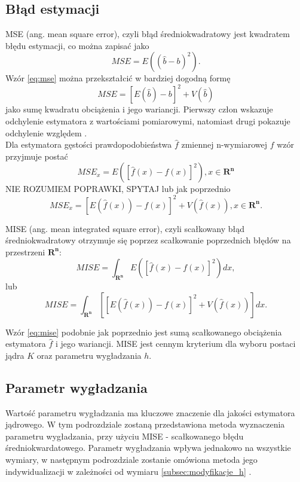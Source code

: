 \subsection{Błąd estymacji}
MSE (ang. mean square error), czyli błąd średniokwadratowy jest kwadratem błędu estymacji, co można zapisać jako \cite{Kul05}
\begin{equation}
\label{eq:mse}
MSE = E({(\hat{b}-b)}^2 ).
\end{equation}
Wzór \eqref{eq:mse} można przekształcić w bardziej dogodną formę
\begin{equation}
MSE = {[E(\hat{b})-b]}^2 +V(\hat{b})
\end{equation}
jako sumę kwadratu obciążenia i jego wariancji. Pierwszy człon wskazuje odchylenie  estymatora z wartościami pomiarowymi, natomiast drugi pokazuje odchylenie względem . \\
Dla estymatora gęstości prawdopodobieństwa $\hat{f}$ zmiennej n-wymiarowej $f$ wzór przyjmuje postać
\begin{equation}
MSE_x = E({[\hat{f}(x)-f(x)]}^2), x \in \mathbf{R^n}
\end{equation} NIE ROZUMIEM POPRAWKI, SPYTAJ
lub jak poprzednio
\begin{equation}
MSE_x = {[E(\hat{f}(x))-f(x)]}^2 + V(\hat{f}(x)), x \in \mathbf{R^n}.
\end{equation}

MISE (ang. mean integrated square error), czyli scałkowany błąd średniokwadratowy otrzymuje się poprzez scałkowanie poprzednich błędów na przestrzeni $\mathbf{R^n}$:
\begin{equation}
MISE = \int_{\mathbf{R^n}} E({[\hat{f}(x)-f(x)]}^2) dx,
\end{equation}
lub
\begin{equation}
\label{eq:mise}
MISE = \int_{\mathbf{R^n}} [{[E(\hat{f}(x))-f(x)]}^2 + V(\hat{f}(x))]dx.
\end{equation}

Wzór \eqref{eq:mise} podobnie jak poprzednio jest sumą scałkowanego obciążenia estymatora $\hat{f}$ i jego wariancji. MISE jest cennym kryterium dla wyboru postaci jądra $K$ oraz parametru wygładzania $h$.

\subsection{Parametr wygładzania}

Wartość parametru wygładzania ma kluczowe znaczenie dla jakości estymatora jądrowego. W tym podrozdziale zostaną przedstawiona metoda wyznaczenia parametru wygładzania, przy użyciu MISE - scałkowanego błędu średniokwardatowego. Parametr wygładzania wpływa jednakowo na wszystkie wymiary, w następnym podrozdziale zostanie omówiona metoda jego indywidualizacji w zależności od wymiaru \ref{subsec:modyfikacje_h} \cite{Kul12}.

